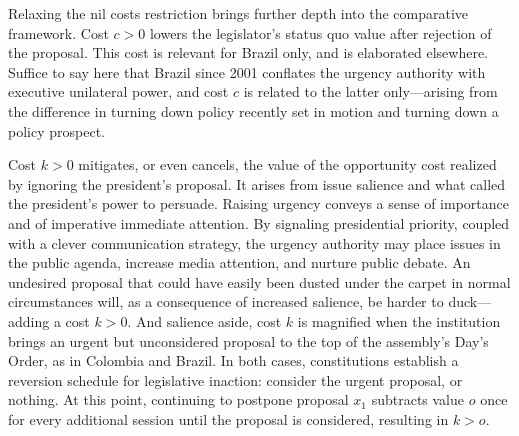 \documentclass[letter,12pt]{article}
\begin{document}
Relaxing the nil costs restriction brings further depth into the comparative framework. Cost $c>0$ lowers the legislator's status quo value after rejection of the proposal. This cost is relevant for Brazil only, and is elaborated elsewhere. Suffice to say here that Brazil since 2001 conflates the urgency authority with executive unilateral power, and cost $c$ is related to the latter only---arising from the difference in turning down policy recently set in motion and turning down a policy prospect. 


Cost $k>0$ mitigates, or even cancels, the value of the opportunity cost realized by ignoring the president's proposal. It arises from issue salience and what \citet{neustadt.1990} called the president's power to persuade. Raising urgency conveys a sense of importance and of imperative immediate attention. By signaling presidential priority, coupled with a clever communication strategy, the urgency authority may place issues in the public agenda, increase media attention, and nurture public debate. An undesired proposal that could have easily been dusted under the carpet in normal circumstances will, as a consequence of increased salience, be harder to duck---adding a cost $k>0$. And salience aside, cost $k$ is magnified when the institution brings an urgent but unconsidered proposal to the top of the assembly's Day's Order, as in Colombia and Brazil. In both cases, constitutions establish a reversion schedule for legislative inaction: consider the urgent proposal, or nothing. At this point, continuing to postpone proposal $x_1$ subtracts value $o$ once for every additional session until the proposal is considered, resulting in $k>o$. 
\end{document}
